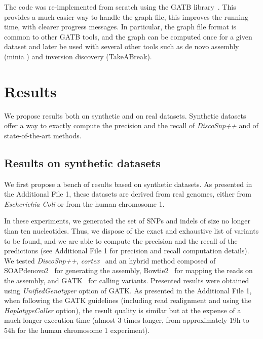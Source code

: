 \documentclass{bmcart}
\newcommand{\discopp}{{\it DiscoSnp++}\xspace}
\newcommand{\co}{{\it cortex}\xspace}
\begin{document}
The code was re-implemented from scratch using the GATB library~\cite{Drezen2014}. This provides a much easier way to handle the graph file, this improves the running time, with clearer progress messages. 
In particular, the graph file format is common to other GATB tools, and the graph can be computed once for a given dataset and later be used with several other tools such as de novo assembly (minia \cite{Chikhi2013}) and inversion discovery (TakeABreak\cite{lemaitre:hal-01063157}). 





\section*{Results}

We propose results both on synthetic and on real datasets. Synthetic datasets offer a way to exactly compute the precision and the recall of \discopp and of state-of-the-art methods. 

\subsection*{Results on synthetic datasets}
We first propose a bench of results based on synthetic datasets. As presented in the Additional File 1, these datasets are derived from real genomes, either from \emph{Escherichia Coli} or from the human chromosome 1. 

In these experiments, we generated the set of SNPs and indels of size no longer than ten nucleotides. 
Thus, we dispose of the exact and exhaustive list of variants to be found, and we are able to compute the precision and the recall of the predictions (see Additional File 1 for precision and recall computation details). We tested \discopp, \co~\cite{iqbal2012novo} and an hybrid method composed of SOAPdenovo2~\cite{luo2012soapdenovo2} for generating the assembly, Bowtie2~\cite{langmead2012fast} for mapping the reads on the assembly, and GATK~\cite{gatk} for calling variants. Presented results were obtained using \emph{UnifiedGenotyper} option of GATK. As presented in the Additional File 1, when following the GATK guidelines (including read realignment and using the \emph{HaplotypeCaller} option), the result quality is similar but at the expense of a much longer execution time (almost 3 times longer, from approximately 19h to 54h for the human chromosome 1 experiment). 
\end{document}
